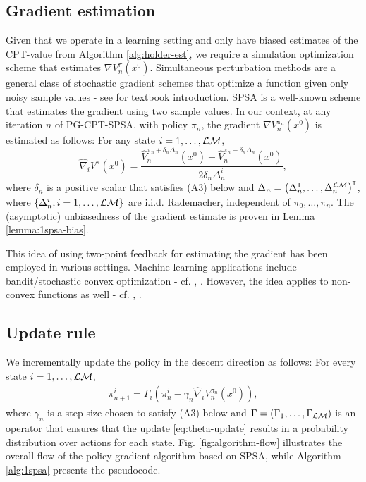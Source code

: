 \documentclass[11pt,letterpaper,english]{article}
\begin{document}
\subsection{Gradient estimation} 
Given that we operate in a learning setting and only have biased estimates of the CPT-value from Algorithm \ref{alg:holder-est}, we require a simulation optimization scheme that estimates $\nabla V_n^\pi(x^0)$.  
Simultaneous perturbation methods are a general class of stochastic gradient schemes that optimize a function given only noisy sample values - see \cite{Bhatnagar13SR} for textbook introduction. SPSA is a well-known scheme that estimates the gradient using two sample values. In our context, at any iteration $n$ of PG-CPT-SPSA, with policy $\pi_n$, the gradient $\nabla V_n^{\pi_n}(x^0)$ is estimated as follows: For any state $i=1,\ldots,\mathcal{L}\mathcal{M}$,
$$\widehat \nabla_{i} V^\pi(x^0) = \dfrac{\widehat V_n^{\pi_n+\delta_n \Delta_n}(x^0) - \widehat V_n^{\pi_n-\delta_n \Delta_n}(x^0)}{2 \delta_n \Delta_n^{i}},$$
where $\delta_n$ is a positive scalar that satisfies (A3) below and $\Delta_n = \left( \Delta_n^{1},\ldots,\Delta_n^{\mathcal{L}\mathcal{M}}\right)^\mathsf{\scriptscriptstyle T}$, where $\{\Delta_n^{i}, i=1,\ldots,\mathcal{L}\mathcal{M}\}$ are i.i.d. Rademacher, independent of $\pi_0,\ldots,\pi_n$.
The (asymptotic) unbiasedness of the gradient estimate is proven in Lemma \ref{lemma:1spsa-bias}.

This idea of using two-point feedback for estimating the gradient has been employed in various settings. Machine learning applications include bandit/stochastic convex optimization - cf. 
\cite{hazan2015online}, \cite{duchi2013optimal}. However, the idea applies to non-convex functions as well - cf. \cite{spall2005introduction}, \cite{Bhatnagar13SR}.


\subsection{Update rule} We incrementally update the policy in the descent direction as follows: For every state $i=1,\ldots,\mathcal{L}\mathcal{M}$,
\begin{align}
\pi^{i}_{n+1} = \Gamma_{i}\left(\pi^{i}_n - \gamma_n \widehat \nabla_{i} V_n^{\pi_n}(x^0)\right),
\label{eq:theta-update}
\end{align}
where  $\gamma_n$ is a step-size chosen to satisfy (A3) below and
$\Gamma=\left(\Gamma_{1},\ldots,\Gamma_{\mathcal{L}\mathcal{M}}\right)$ is an operator that ensures that the update \eqref{eq:theta-update} results in a probability distribution over actions for each state. 
Fig. \ref{fig:algorithm-flow} illustrates the overall flow of the policy gradient algorithm based on SPSA, while Algorithm \ref{alg:1spsa}  presents the pseudocode.  
\end{document}
